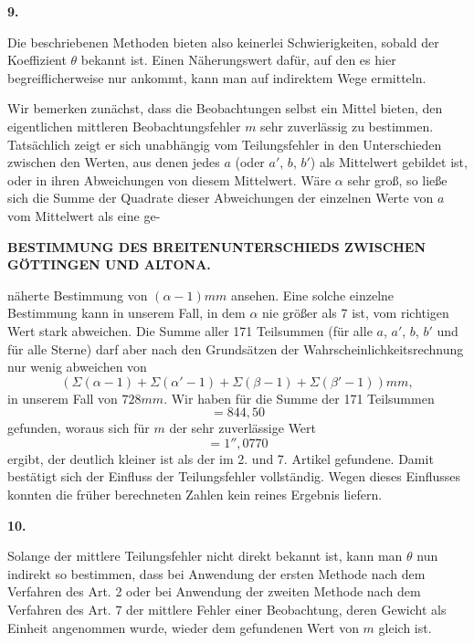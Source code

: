 \begin{center}\textbf{9.}\end{center}

Die beschriebenen Methoden bieten also keinerlei Schwierigkeiten, sobald
der Koeffizient \(\theta\) bekannt ist. Einen Näherungswert dafür, auf den
es hier begreiflicherweise nur ankommt, kann man auf indirektem
Wege ermitteln.

Wir bemerken zunächst, dass die Beobachtungen selbst ein Mittel bieten,
den eigentlichen mittleren Beobachtungsfehler \(m\) sehr zuverlässig zu
bestimmen. Tatsächlich zeigt er sich unabhängig vom Teilungsfehler in den
Unterschieden zwischen den  Werten, aus denen jedes
\(a\) (oder \(a'\), \(b\), \(b'\)) als Mittelwert gebildet ist, oder in ihren Abweichungen
von diesem Mittelwert. Wäre \(\alpha\) sehr groß, so ließe sich die Summe der Quadrate
dieser Abweichungen der einzelnen Werte von \(a\) vom Mittelwert als eine ge-
\par

\par\clearpage
\noindent{}\parbox[t]{\dimexpr\linewidth-24mm\relax}{\centering\scriptsize\bfseries BESTIMMUNG DES BREITENUNTERSCHIEDS ZWISCHEN GÖTTINGEN UND ALTONA.}\makebox[12mm][r]{}\par\medskip

\noindent näherte Bestimmung von \((\alpha-1)mm\) ansehen. Eine solche einzelne
Bestimmung kann in unserem Fall, in dem \(\alpha\) nie größer als 7 ist, vom
richtigen Wert stark abweichen. Die Summe aller 171 Teilsummen
(für alle \(a\), \(a'\), \(b\), \(b'\) und für alle Sterne) darf aber nach den Grundsätzen
der Wahrscheinlichkeitsrechnung nur wenig abweichen von
\[
(\Sigma(\alpha-1)+\Sigma(\alpha'-1)+\Sigma(\beta-1)+\Sigma(\beta'-1))mm,
\]
\noindent in unserem Fall von \(728mm\). Wir haben für die Summe
der 171 Teilsummen
\[
=844{,}50
\]
\noindent gefunden, woraus sich für \(m\) der sehr zuverlässige Wert
\[
=1''{,}0770
\]
\noindent ergibt, der deutlich kleiner ist als der im 2. und 7. Artikel gefundene. Damit
bestätigt sich der Einfluss der Teilungsfehler vollständig. Wegen dieses Einflusses
konnten die früher berechneten Zahlen kein reines Ergebnis liefern.

\begin{center}\textbf{10.}\end{center}

Solange der mittlere Teilungsfehler nicht direkt bekannt ist, kann man
\(\theta\) nun indirekt so bestimmen, dass bei Anwendung
der ersten Methode nach dem Verfahren des Art. 2 oder bei Anwendung
der zweiten Methode nach dem Verfahren des Art. 7 der mittlere Fehler
einer Beobachtung, deren Gewicht als Einheit angenommen wurde, wieder
dem gefundenen Wert von \(m\) gleich ist.

